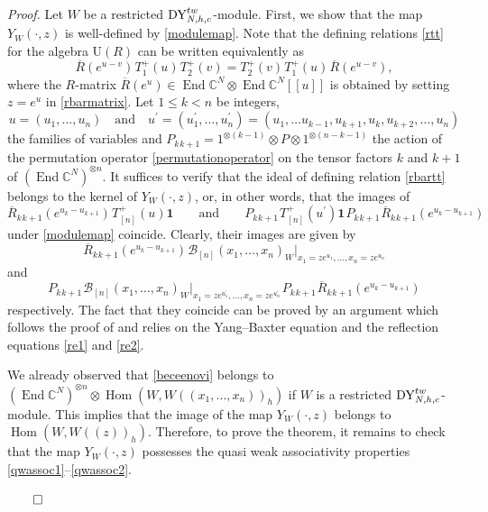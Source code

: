 \documentclass[12pt,a4paper,reqno]{amsart}
\theoremstyle{stil}
\theoremstyle{defi}
\theoremstyle{defi}
\theoremstyle{stil}
\theoremstyle{stil}
\theoremstyle{stil}
\theoremstyle{prim}
\newenvironment{prf}{\noindent \textit{Proof.}}{\null\hfill$\qed$\hskip
2mm\vskip 2mm}
\newcommand{\wvr}{\overline}
\newcommand{\fand}{\quad\text{and}\quad}
\newcommand{\Fand}{\qquad\text{and}\qquad}
\newcommand{\beq}{\begin{equation}}
\newcommand{\eeq}{\end{equation}}
\newcommand{\ot}{\otimes}
\newcommand{\ts}{\hspace{1pt}}
\newcommand{\ndo}{\mathop{\mathrm{End}}}
\newcommand{\om}{\mathop{\mathrm{Hom}}}
\newcommand{\R}{\wvr{R}}
\newcommand{\dyho}{{\rm DY}_{N,h,c}^{tw}  }
\newcommand{\vac}{ \mathrm{\boldsymbol{1}}}
\newcommand{\CC}{\mathbb{C}}
\newcommand{\bc}{\mathcal{B}}
\begin{document}
\begin{prf}
Let $W$ be a restricted $\dyho$-module. First, we show that the map $Y_W(\cdot, z)$ is well-defined by \eqref{modulemap}. Note that the defining relations \eqref{rtt} for the algebra $\textrm{U}(R)$ can be written equivalently as
\beq\label{rbartt}
\R(e^{u-v})\ts T^+_{1} (u)\ts T^+_2  (v)=  T^+_2  (v)\ts T^+_{1} (u)\ts \R(e^{u-v}),
\eeq
where the $R$-matrix $\R(e^u)\in\ndo\CC^N\ot\ndo\CC^N[[u]]$ is obtained by setting $z=e^u$ in
\eqref{rbarmatrix}. 
Let $1\leqslant k<n$ be integers,  
$$u=(u_1,\ldots ,u_n)\fand u^\prime=(u_1^\prime,\ldots,u_n^\prime)=(u_1,\ldots u_{k-1},u_{k+1},u_k,u_{k+2},\ldots,u_n)$$
 the families of variables and $P_{k\ts k+1}=1^{\ot(k-1)}\ot P\ot 1^{\ot(n-k-1)}$   the action of the permutation operator
\eqref{permutationoperator}
on the tensor factors $k$ and $k+1$ of $(\ndo\CC^N)^{\ot n}$.
It suffices to verify that the ideal of defining relation \eqref{rbartt} belongs to the kernel of $Y_W(\cdot, z)$, or, in other words, that the images of
$$
\R_{k\ts k+1}(e^{u_k - u_{k+1}})\ts T_{[n]}^+(u )\vac
\Fand
P_{k\ts k+1}\ts T_{[n]}^+(u^\prime )\vac\ts P_{k\ts k+1}\ts \R_{k\ts k+1}(e^{u_k - u_{k+1}})
$$
under \eqref{modulemap} coincide. Clearly, their images are given by
$$
\R_{k\ts k+1}(e^{u_k - u_{k+1}})\ts
\bc_{[n]}(x_1, \ldots ,x_n )_W\big|_{x_1=ze^{u_1},\ldots ,x_n=ze^{u_n}}
$$
and
$$
P_{k\ts k+1}\ts
\bc_{[n]}(x_1, \ldots ,x_n )_W\big|_{x_1=ze^{u^\prime_1},\ldots ,x_n=ze^{u^\prime_n}}
\ts P_{k\ts k+1}\ts \R_{k\ts k+1}(e^{u_k - u_{k+1}}) 
$$
respectively. The fact that they coincide can be proved by an argument which follows the proof of \cite[Lemma 3.6]{KS} and relies on the   Yang--Baxter equation and the reflection equations \eqref{re1} and \eqref{re2}.

We already observed   that  \eqref{beceenovi} belongs to
$(\ndo\CC^N)^{\ot n}\ot\om(W,W((x_1,\ldots ,x_n))_h) $
if $W$ is a restricted $\dyho$-module. This implies that the image of the map
$Y_W(\cdot, z)$ belongs to $\om(W,W((z))_h)$. Therefore, to prove the theorem, it remains to check that  the map
$Y_W(\cdot, z)$ possesses the quasi weak associativity properties 
\eqref{qwassoc1}--\eqref{qwassoc2}.


\end{prf}
\end{document}
